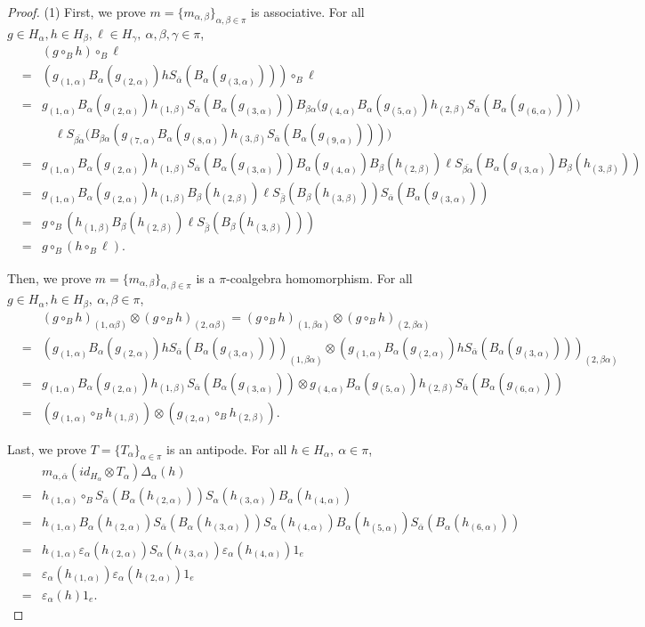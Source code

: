 \documentclass[10pt,a4paper]{amsart}
\def\a{\alpha}
\def\b{\beta}
\def\g{\gamma}
\def\v{\varepsilon}
\begin{document}
\begin{proof}
(1) First, we prove $m=\{m_{\a,\b}\}_{\a,\b\in\pi}$ is  associative. For all $g\in H_\a, h\in H_\b, \ell\in H_\g, ~\a,\b,\g\in\pi$,
\begin{eqnarray*}
& & (g\circ_B h) \circ_B\ell \\
&=& (g_{(1,\a)}B_\a(g_{(2,\a)})hS_{\bar{\a}}(B_\a(g_{(3,\a)}))) \circ_B\ell \\
&=& g_{(1,\a)}B_\a(g_{(2,\a)})h_{(1,\b)}S_{\bar{\a}}(B_\a(g_{(3,\a)}))  B_{\b\a}\big( g_{(4,\a)} B_\a(g_{(5,\a)})h_{(2,\b)}S_{\bar{\a}}(B_\a(g_{(6,\a)})) \big) \\
&&\quad \ell S_{\bar{\b\a}}\big(B_{\b\a}( g_{(7,\a)} B_\a(g_{(8,\a)})h_{(3,\b)}S_{\bar{\a}}(B_\a(g_{(9,\a)})) )\big) \\
&=& g_{(1,\a)}B_\a(g_{(2,\a)})h_{(1,\b)}S_{\bar{\a}}(B_\a(g_{(3,\a)}))  B_\a(g_{(4,\a)})   B_\b(h_{(2,\b)})\ell  S_{\bar{\b\a}}( B_\a(g_{(3,\a)}) B_\b(h_{(3,\b)}) ) \\
&=& g_{(1,\a)}B_\a(g_{(2,\a)})h_{(1,\b)} B_\b(h_{(2,\b)})\ell S_{\bar{\b}}(B_\b(h_{(3,\b)})) S_{\bar{\a}}(B_\a(g_{(3,\a)})) \\
&=& g\circ_B( h_{(1,\b)} B_\b(h_{(2,\b)})\ell S_{\bar{\b}}(B_\b(h_{(3,\b)})) ) \\
&=& g\circ_B(h\circ_B \ell).
\end{eqnarray*}



  Then, we prove $m=\{m_{\a,\b}\}_{\a,\b\in\pi}$ is a $\pi$-coalgebra homomorphism. For all $g\in H_\a, h\in H_\b, ~\a,\b\in\pi$,
\begin{eqnarray*}
& & (g\circ_B h)_{(1,\a\b)} \otimes (g\circ_B h)_{(2,\a\b)} = (g\circ_B h)_{(1,\b\a)} \otimes (g\circ_B h)_{(2,\b\a)} \\
&=& (g_{(1,\a)}B_\a(g_{(2,\a)})hS_{\bar{\a}}(B_\a(g_{(3,\a)})))_{(1,\b\a)} \otimes (g_{(1,\a)}B_\a(g_{(2,\a)})hS_{\bar{\a}}(B_\a(g_{(3,\a)})))_{(2,\b\a)}  \\
&=& g_{(1,\a)}B_\a(g_{(2,\a)})h_{(1,\b)}S_{\bar{\a}}(B_\a(g_{(3,\a)})) \otimes g_{(4,\a)}B_\a(g_{(5,\a)})h_{(2,\b)}S_{\bar{\a}}(B_\a(g_{(6,\a)}))  \\
&=& (g_{(1,\a)}\circ_B h_{(1,\b)})\otimes(g_{(2,\a)}\circ_B h_{(2,\b)}).
\end{eqnarray*}

  Last, we prove $T=\{T_\a\}_{\a\in\pi}$ is an antipode. For all $h\in H_\a, ~\a\in\pi$,
\begin{eqnarray*}
& & m_{\a,\bar{\a}}(id_{H_{\a}} \otimes T_\a)\Delta_\a(h) \\
&=& h_{(1,\a)} \circ_B S_{\bar{\a}}(B_\a(h_{(2,\a)}))S_\a(h_{(3,\a)})B_\a(h_{(4,\a)}) \\
&=& h_{(1,\a)}B_\a(h_{(2,\a)}) S_{\bar{\a}}(B_\a(h_{(3,\a)}))S_\a(h_{(4,\a)})B_\a(h_{(5,\a)}) S_{\bar{\a}}(B_\a(h_{(6,\a)})) \\
&=& h_{(1,\a)} \v_\a(h_{(2,\a)}) S_\a(h_{(3,\a)}) \v_\a(h_{(4,\a)}) 1_e \\
&=& \v_\a(h_{(1,\a)}) \v_\a(h_{(2,\a)}) 1_e \\
&=& \v_\a(h)1_e.
\end{eqnarray*}


\end{proof}
\end{document}
